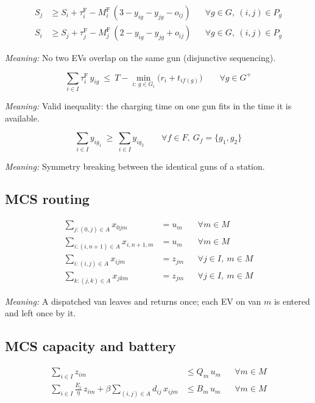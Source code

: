 \documentclass[12pt,a4paper]{article}
\newcommand{\mdesc}[1]{\par{\textit{Meaning:} #1}\par}
\begin{document}
\begin{align}
S_j &\ge S_i+\tau^{\mathrm F}_i-M^{\mathrm F}_i\,(3-y_{ig}-y_{jg}-o_{ij}) && \forall g\in G,\ (i,j)\in P_g \label{eq:disj1}\\
S_i &\ge S_j+\tau^{\mathrm F}_j-M^{\mathrm F}_j\,(2-y_{ig}-y_{jg}+o_{ij}) && \forall g\in G,\ (i,j)\in P_g \label{eq:disj2}
\end{align}
\mdesc{No two EVs overlap on the same gun (disjunctive sequencing).}

\begin{equation}
\sum_{i\in I}\tau^{\mathrm F}_i\,y_{ig}\ \le\ T-\min_{i:\,g\in G_i}\Big(r_i+t_{if(g)}\Big)\qquad\forall g\in G^{+} \label{eq:gunload}
\end{equation}
\mdesc{Valid inequality: the charging time on one gun fits in the time it is available.}

\begin{equation}
\sum_{i\in I}y_{ig_1}\ \ge\ \sum_{i\in I}y_{ig_2}\qquad\forall f\in F,\ G_f=\{g_1,g_2\} \label{eq:gunsym}
\end{equation}
\mdesc{Symmetry breaking between the identical guns of a station.}

\subsection{MCS routing}
\begin{align}
\sum_{j:(0,j)\in A}x_{0jm} &= u_m && \forall m\in M \label{eq:out}\\
\sum_{i:(i,n+1)\in A}x_{i,n+1,m} &= u_m && \forall m\in M \label{eq:in}\\
\sum_{i:(i,j)\in A}x_{ijm} &= z_{jm} && \forall j\in I,\ m\in M \label{eq:flowin}\\
\sum_{k:(j,k)\in A}x_{jkm} &= z_{jm} && \forall j\in I,\ m\in M \label{eq:flowout}
\end{align}
\mdesc{A dispatched van leaves and returns once; each EV on van $m$ is entered and left once by it.}

\subsection{MCS capacity and battery}
\begin{align}
\sum_{i\in I}z_{im} &\le Q_m\,u_m && \forall m\in M \label{eq:cap}\\
\sum_{i\in I}\frac{E_i}{\eta}\,z_{im}+\beta\sum_{(i,j)\in A}d_{ij}\,x_{ijm} &\le B_m\,u_m && \forall m\in M \label{eq:batt}
\end{align}
\end{document}
